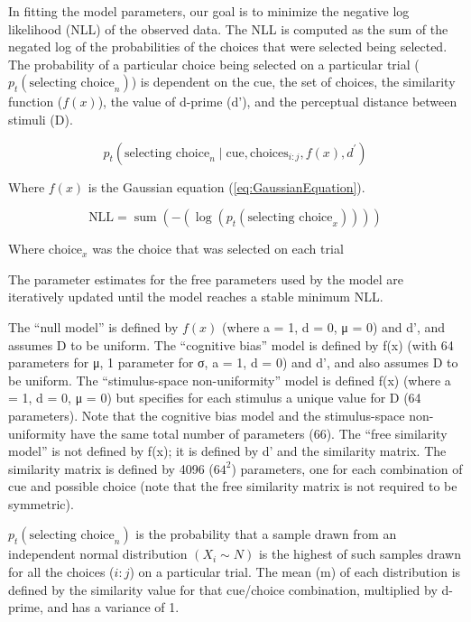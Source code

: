 In fitting the model parameters, our goal is to minimize the negative log likelihood (NLL) of the observed data. 
The NLL is computed as the sum of the negated log of the probabilities of the choices that were selected being selected. 
The probability of a particular choice being selected on a particular trial ($p_t(\text{selecting choice}_n)$) is dependent on the cue, the set of choices, the similarity function ($f(x)$), the value of d-prime (d’), and the perceptual distance between stimuli (D).

\begin{equation} \label{eq:pt}
    p_t\left(\text{selecting choice}_n \mid \text{cue},\text{choices}_{i:j}, f(x), d^{\prime}\right)
\end{equation}

Where $f(x)$ is the Gaussian equation (\autoref{eq:GaussianEquation}).

\begin{equation}
    \text{NLL} = \operatorname{sum}\left(-\left(\log \left(p_t\left(\text {selecting choice}_x\right)\right)\right)\right)
\end{equation}

Where $\text{choice}_x$ was the choice that was selected on each trial

The parameter estimates for the free parameters used by the model are iteratively updated until the model reaches a stable minimum NLL. 

The “null model” is defined by $f(x)$ (where a = 1, d = 0, μ = 0) and d’, and assumes D to be uniform. 
The “cognitive bias” model is defined by f(x) (with 64 parameters for μ, 1 parameter for σ, a = 1, d = 0) and d’, and also assumes D to be uniform. 
The “stimulus-space non-uniformity” model is defined f(x) (where a = 1, d = 0, μ = 0) but specifies for each stimulus a unique value for D (64 parameters). 
Note that the cognitive bias model and the stimulus-space non-uniformity have the same total number of parameters (66). 
The “free similarity model” is not defined by f(x); it is defined by d’ and the similarity matrix. 
The similarity matrix is defined by 4096 ($64^2$) parameters, one for each combination of cue and possible choice (note that the free similarity matrix is not required to be symmetric).

$p_t(\text{selecting choice}_n)$ is the probability that a sample drawn from an independent normal distribution $(X_i \sim N)$ is the highest of such samples drawn for all the choices ($i:j$) on a particular trial. 
The mean (m) of each distribution is defined by the similarity value for that cue/choice combination, multiplied by d-prime, and has a variance of 1.

